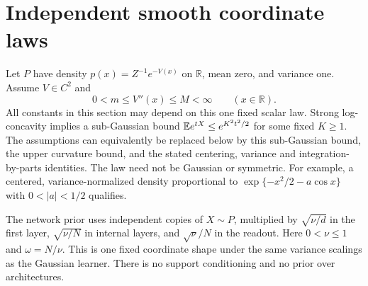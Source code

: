 \section{Independent smooth coordinate laws}
\label{sec:nongaussian-law}
Let $P$ have density $p(x)=Z^{-1}e^{-V(x)}$ on $\mathbb R$, mean zero,
and variance one. Assume $V\in C^2$ and
\begin{equation}
 0<m\le V''(x)\le M<\infty\qquad(x\in\mathbb R).
 \label{eq:coordinate-curvature}
\end{equation}
All constants in this section may depend on this one fixed scalar law.
Strong log-concavity implies a sub-Gaussian bound
$\mathbb E e^{tX}\le e^{K^2t^2/2}$ for some fixed $K\ge1$.
The assumptions can equivalently be replaced below by this
sub-Gaussian bound, the upper curvature bound, and the stated
centering, variance and integration-by-parts identities.
The law need not be Gaussian or symmetric. For example, a centered,
variance-normalized density proportional to
$\exp\{-x^2/2-a\cos x\}$ with $0<|a|<1/2$ qualifies.

The network prior uses independent copies of $X\sim P$, multiplied by
$\sqrt{\nu/d}$ in the first layer, $\sqrt{\nu/N}$ in internal layers,
and $\sqrt\nu/N$ in the readout. Here $0<\nu\le1$ and
$\omega=N/\nu$. This is one fixed coordinate shape under the same
variance scalings as the Gaussian learner. There is no support
conditioning and no prior over architectures.

